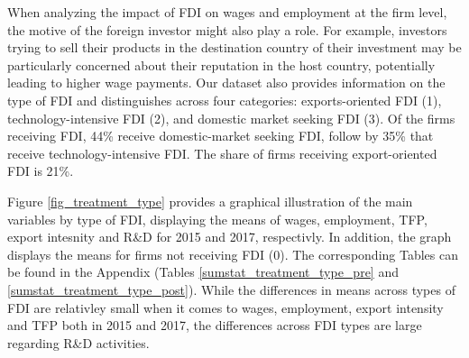 When analyzing the impact of FDI on wages and employment at the firm level, the  motive of the foreign investor might also play a role. For example, investors trying to sell their products in the destination country of their investment  may be particularly concerned about their reputation in the host country, potentially leading to higher wage payments. Our dataset also provides information on the type of FDI and distinguishes across four categories: exports-oriented FDI (1),  technology-intensive FDI (2), and domestic market seeking FDI (3). Of the firms receiving FDI, 44\% receive domestic-market seeking FDI, follow by 35\% that receive technology-intensive FDI. The share of firms receiving export-oriented FDI is 21\%. \\ \par

Figure \ref{fig_treatment_type} provides a graphical illustration of the main variables by type of FDI, displaying the means of wages, employment, TFP, export intesnity and R\&D for 2015 and 2017, respectivly. In addition, the graph displays the means for firms not receiving FDI (0). The corresponding Tables can be found in the Appendix (Tables \ref{sumstat_treatment_type_pre} and \ref{sumstat_treatment_type_post}). While the differences in means across types of FDI are relativley small when it comes to wages, employment, export intensity and TFP both in 2015 and 2017, the differences across FDI types are large regarding R\&D activities.
